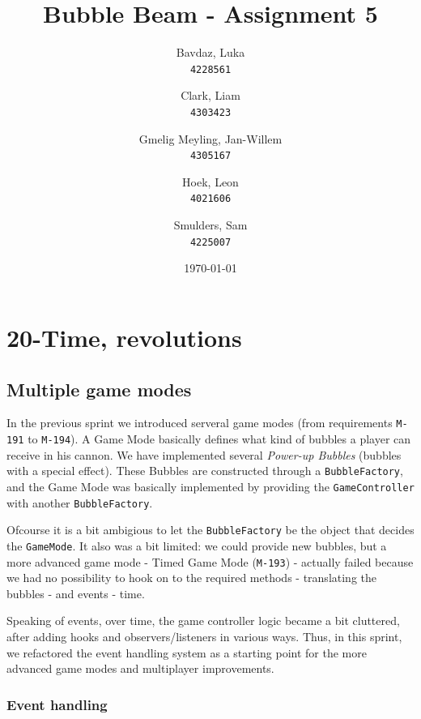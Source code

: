 \documentclass[a4paper]{article}
\title{Bubble Beam - Assignment 5}
\author{
    Bavdaz, Luka\\
    \texttt{4228561}
    \and
    Clark, Liam\\
    \texttt{4303423}
    \and
    Gmelig Meyling, Jan-Willem\\
    \texttt{4305167}
    \and
    Hoek, Leon\\
    \texttt{4021606}
    \and
    Smulders, Sam\\
    \texttt{4225007}
}
\date{\today}
\begin{document}
\maketitle



\section{20-Time, revolutions}

\subsection{Multiple game modes}
In the previous sprint we introduced serveral game modes (from requirements \texttt{M-191} to \texttt{M-194}). A Game Mode basically defines what kind of bubbles a player can receive in his cannon. We have implemented several \textit{Power-up Bubbles} (bubbles with a special effect). These Bubbles are constructed through a \texttt{BubbleFactory}, and the Game Mode was basically implemented by providing the \texttt{GameController} with another \texttt{BubbleFactory}.

\par{}Ofcourse it is a bit ambigious to let the \texttt{BubbleFactory} be the object that decides the \texttt{GameMode}. It also was a bit limited: we could provide new bubbles, but a more advanced game mode - Timed Game Mode (\texttt{M-193}) - actually failed because we had no possibility to hook on to the required methods - translating the bubbles - and events - time.

\par{}Speaking of events, over time, the game controller logic became a bit cluttered, after adding hooks and observers/listeners in various ways. Thus, in this sprint, we refactored the event handling system as a starting point for the more advanced game modes and multiplayer improvements.

\subsubsection{Event handling}
\label{sec:evthdl}
\end{document}
